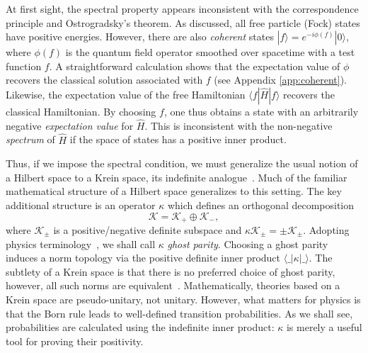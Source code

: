\documentclass[pra,aps,amsmath,amssymb,notitlepage, twocolumn,superscriptaddress,longbibliography,nofootinbib,floatfix,10pt]{revtex4-2}
\begin{document}
At first sight, the spectral property appears inconsistent with the correspondence principle and Ostrogradsky's theorem. As discussed, all free particle (Fock) states have positive energies. However, there are also {\it coherent} states $|f\rangle=e^{-i \phi(f)}|0\rangle$, where $\phi(f)$ is the quantum field operator smoothed over spacetime with a test function $f$. A straightforward calculation shows that the expectation value of $\phi$ recovers the classical solution associated with $f$ (see Appendix \ref{app:coherent}).  Likewise, the expectation value of the free Hamiltonian $\langle f| \hat{H}|f\rangle$ recovers the classical Hamiltonian.
By choosing $f$, one thus obtains a state with an arbitrarily negative {\it expectation value} for $\hat{H}$. This is inconsistent with the non-negative {\it spectrum} of $\hat{H}$ if the space of states has a positive inner product.  


Thus, if we impose the spectral condition, we must generalize the usual notion of a Hilbert space to a Krein space, its indefinite analogue~\cite{azizov1994krein}. Much of the familiar mathematical structure of a Hilbert space generalizes to this setting. The key additional structure is an operator $\kappa$ which defines an orthogonal decomposition
\begin{equation}\label{eq:Krein_decomp}
    \mathcal{K=\mathcal{K}_+\oplus\mathcal{K}_-},
\end{equation}
where $\mathcal{K}_\pm$ is a positive/negative definite subspace and $\kappa\mathcal{K}_\pm=\pm\mathcal{K}_\pm$. Adopting physics terminology~\cite{Holdom:2024onr}, we shall call $\kappa$ {\it ghost parity}. Choosing a ghost parity induces a norm topology via the positive definite inner product $\langle\_|\kappa|\_\rangle$. The subtlety of a Krein space is that there is no preferred choice of ghost parity, however, all such norms are equivalent~\cite{morchio1980infrared}.
Mathematically, theories based on a Krein space are pseudo-unitary, not unitary. However, what matters for physics is that the Born rule leads to well-defined transition probabilities. As we shall see, probabilities are calculated using the indefinite inner product: $\kappa$ is merely a useful tool for proving their positivity.
\end{document}
